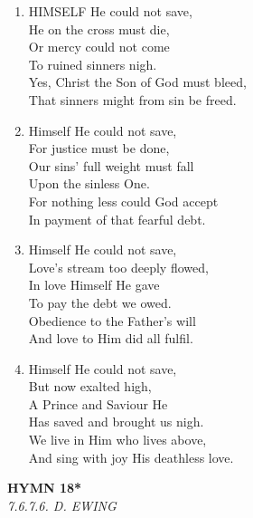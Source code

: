 \documentclass[11pt,a4paper]{article}
\begin{document}
\begin{enumerate}
    \item HIMSELF He could not save, \\
        He on the cross must die, \\
        Or mercy could not come \\
        To ruined sinners nigh. \\
        Yes, Christ the Son of God must bleed, \\
        That sinners might from sin be freed.

    \item Himself He could not save, \\
        For justice must be done, \\
        Our sins' full weight must fall \\
        Upon the sinless One. \\
        For nothing less could God accept \\
        In payment of that fearful debt.

    \item Himself He could not save, \\
        Love's stream too deeply flowed, \\
        In love Himself He gave \\
        To pay the debt we owed. \\
        Obedience to the Father's will \\
        And love to Him did all fulfil.

    \item Himself He could not save, \\
        But now exalted high, \\
        A Prince and Saviour He \\
        Has saved and brought us nigh. \\
        We live in Him who lives above, \\
        And sing with joy His deathless love.

\end{enumerate}

\newpage
\begin{center}
    {\Large \textbf{HYMN 18*\textdagger{}}}
    \\
    \textit{7.6.7.6. D. EWING}
\end{center}
\vspace{1em}
\end{document}
